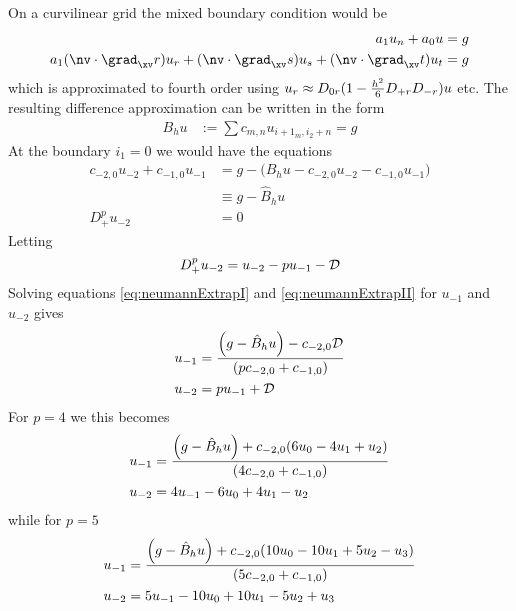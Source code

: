 On a curvilinear grid the mixed boundary condition would be 
\begin{align*}
    a_1 u_n + a_0 u & = g \\
    a_1 (\nv\cdot\grad_\xv r ) u_r + (\nv\cdot\grad_\xv s ) u_s + (\nv\cdot\grad_\xv t ) u_t & = g
\end{align*}
which is approximated to fourth order using $u_r \approx D_{0r}(1-{h^2\over6} D_{+r}D_{-r}) u$ etc.
The resulting difference approximation can be written in the form
\begin{align*}
    B_h u &:= \sum c_{m,n} u_{i+1_m,i_2+n} = g
\end{align*}
At the boundary $i_1=0$ we would have the equations
\begin{align}
  c_{-2,0} u_{-2} + c_{-1,0} u_{-1} & = g - \Big( B_h u  - c_{-2,0} u_{-2} -  c_{-1,0} u_{-1} \Big) \nonumber \\
                                    & \equiv g - \hat{B}_h u \label{eq:neumannExtrapI}   \\
    D_+^p u_{-2} & = 0   \label{eq:neumannExtrapII}
\end{align}
\newcommand{\Dc}{{\cal D}}
Letting 
\[
   D_+^p u_{-2} = u_{-2} - p u_{-1} -  \Dc
\]
Solving equations \ref{eq:neumannExtrapI} and \ref{eq:neumannExtrapII} for $u_{-1}$ and $u_{-2}$ gives
\begin{align*}
    u_{-1} &=  { \Big( g - \hat{B}_h u \Big)  - c_{-2,0}\Dc  \over  ( p c_{-2,0} + c_{-1,0} ) } \\
    u_{-2} &= p u_{-1} + \Dc
\end{align*}
For $p=4$ we this becomes
\begin{align*}
    u_{-1} &=  { \Big( g - \hat{B}_h u \Big)  + c_{-2,0}( 6 u_0 - 4 u_1 + u_2 )  \over  ( 4 c_{-2,0} + c_{-1,0} ) } \\
    u_{-2} &= 4 u_{-1} -6 u_0 + 4 u_1 - u_2
\end{align*}
while for $p=5$
\begin{align*}
    u_{-1} &=  { \Big( g - \hat{B}_h u \Big)  + c_{-2,0}( 10 u_0 -10 u_1 +5 u_2 -u_3 )  \over  ( 5 c_{-2,0} + c_{-1,0} ) } \\
    u_{-2} &= 5u_{-1} -10 u_0 + 10 u_1 - 5 u_2 + u_3
\end{align*}

